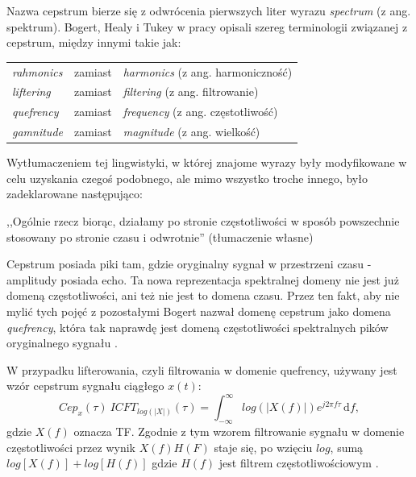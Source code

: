 \documentclass[12pt,a4paper,twoside]{mwart}
\begin{document}
Nazwa cepstrum bierze się z odwrócenia pierwszych liter wyrazu \textit{spectrum} (z ang. spektrum). Bogert, Healy i Tukey w pracy \cite{Transcription:Bogert:FirstCepstrum} opisali szereg terminologii związanej z cepstrum, między innymi takie jak:
\begin{table}[H]\centering
  \begin{tabular}{lll}
  \textit{rahmonics} & zamiast & \textit{harmonics} (z ang. harmoniczność) \\
  \textit{liftering} & zamiast & \textit{filtering} (z ang. filtrowanie) \\
  \textit{quefrency} & zamiast & \textit{frequency} (z ang. częstotliwość) \\
  \textit{gamnitude} & zamiast & \textit{magnitude} (z ang. wielkość)
  \end{tabular}
\end{table}
\noindent Wytłumaczeniem tej lingwistyki, w której znajome wyrazy były modyfikowane w celu uzyskania czegoś podobnego, ale mimo wszystko troche innego, było zadeklarowane następująco: 
\begin{displayquote}
,,Ogólnie rzecz biorąc, działamy po stronie częstotliwości w sposób powszechnie stosowany po stronie czasu i odwrotnie'' \cite[95]{Transcription:Oppenheim:FromFqToQf} (tłumaczenie własne)
\end{displayquote}

Cepstrum posiada piki tam, gdzie oryginalny sygnał w przestrzeni czasu - amplitudy posiada echo. Ta nowa reprezentacja spektralnej domeny nie jest już domeną częstotliwości, ani też nie jest to domena czasu. Przez ten fakt, aby nie mylić tych pojęć z pozostałymi Bogert nazwał domenę cepstrum jako domena \textit{quefrency}, która tak naprawdę jest domeną częstotliwości spektralnych pików oryginalnego sygnału \cite[1-4]{Transcription:Randall:CepstrumHistory} \cite[210-219]{Transcription:Bogert:FirstCepstrum}.

W przypadku lifterowania, czyli filtrowania w domenie quefrency, używany jest wzór cepstrum sygnału ciągłego $x(t)$:
\begin{equation}\label{eq:ceps:continous}
Cep_x(\tau) \ ICFT_{log(|X|)}(\tau) = \int_{-\infty}^{\infty}  log(|X(f)|)e^{j2\pi f\tau}\,\mathrm{d}f, 
\end{equation}
gdzie  $X(f)$ oznacza TF. Zgodnie z tym wzorem filtrowanie sygnału w domenie częstotliwości przez wynik $X(f)H(F)$ staje się, po wzięciu $log$, sumą $log[X(f)] + log[H(f)]$ gdzie $H(f)$ jest filtrem częstotliwościowym \cite[25-27]{Transcription:Anssi:SignalProcessingMethods}.
\end{document}

